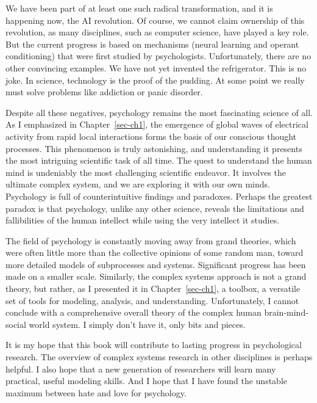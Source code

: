 \documentclass[
  a4paper,
  DIV=11,
  numbers=noendperiod]{scrreprt}
\begin{document}
We have been part of at least one such radical transformation, and it is
happening now, the AI revolution. Of course, we cannot claim ownership
of this revolution, as many disciplines, such as computer science, have
played a key role. But the current progress is based on mechanisms
(neural learning and operant conditioning) that were first studied by
psychologists. Unfortunately, there are no other convincing examples. We
have not yet invented the refrigerator. This is no joke. In science,
technology is the proof of the pudding. At some point we really must
solve problems like addiction or panic disorder.

Despite all these negatives, psychology remains the most fascinating
science of all. As I emphasized in Chapter~\ref{sec-ch1}, the emergence
of global waves of electrical activity from rapid local interactions
forms the basis of our conscious thought processes. This phenomenon is
truly astonishing, and understanding it presents the most intriguing
scientific task of all time. The quest to understand the human mind is
undeniably the most challenging scientific endeavor. It involves the
ultimate complex system, and we are exploring it with our own minds.
Psychology is full of counterintuitive findings and paradoxes. Perhaps
the greatest paradox is that psychology, unlike any other science,
reveals the limitations and fallibilities of the human intellect while
using the very intellect it studies.

The field of psychology is constantly moving away from grand theories,
which were often little more than the collective opinions of some random
man, toward more detailed models of subprocesses and systems.
Significant progress has been made on a smaller scale. Similarly, the
complex systems approach is not a grand theory, but rather, as I
presented it in Chapter~\ref{sec-ch1}, a toolbox, a versatile set of
tools for modeling, analysis, and understanding. Unfortunately, I cannot
conclude with a comprehensive overall theory of the complex human
brain-mind-social world system. I simply don't have it, only bits and
pieces.

It is my hope that this book will contribute to lasting progress in
psychological research. The overview of complex systems research in
other disciplines is perhaps helpful. I also hope that a new generation
of researchers will learn many practical, useful modeling skills. And I
hope that I have found the unstable maximum between hate and love for
psychology.

\end{document}
